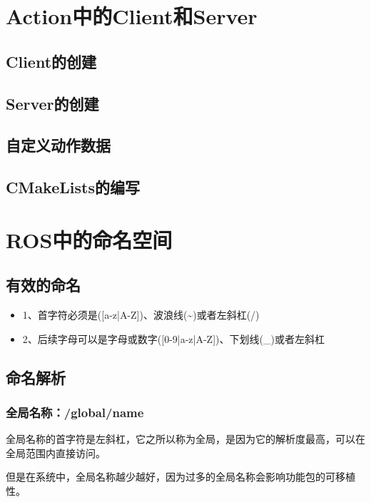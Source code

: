 \documentclass[9pt, oneside]{book}
\begin{document}
\section{Action中的Client和Server}

\subsection{Client的创建}

\subsection{Server的创建}

\subsection{自定义动作数据}

\subsection{CMakeLists的编写}

\section{ROS中的命名空间}

\subsection{有效的命名}

\begin{itemize}
    \item 1、首字符必须是([a-z|A-Z])、波浪线(\textasciitilde)或者左斜杠(/)
    \item 2、后续字母可以是字母或数字([0-9|a-z|A-Z])、下划线(\_)或者左斜杠
\end{itemize}

\subsection{命名解析}

\subsubsection{全局名称：/global/name}

全局名称的首字符是左斜杠，它之所以称为全局，是因为它的解析度最高，可以在全局范围内直接访问。

但是在系统中，全局名称越少越好，因为过多的全局名称会影响功能包的可移植性。
\end{document}
